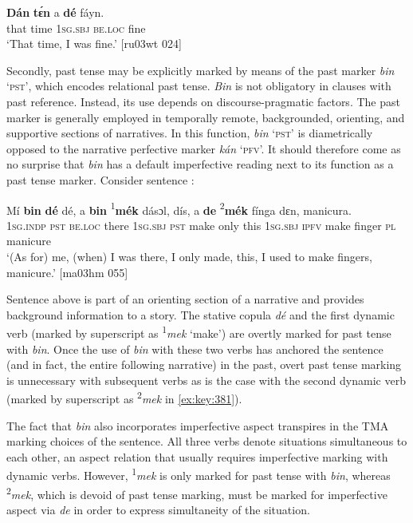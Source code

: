 \ea%
    \label{ex:key:380}
    \gll \textbf{Dán}    \textbf{tɛ́n}    a    \textbf{dé}    fáyn.\\
that    time    \textsc{1sg.sbj}  \textsc{be.loc}  fine\\

\glt ‘That time, I was fine.’ [ru03wt 024]
\z

Secondly, past tense may be explicitly marked by means of the past marker \textit{bin} ‘\textsc{pst’}, which encodes relational past tense. \textit{Bin} is not obligatory in clauses with past reference. Instead, its use depends on discourse-pragmatic factors. The past marker is generally employed in temporally remote, backgrounded, orienting, and supportive sections of narratives. In this function, \textit{bin} ‘\textsc{pst}’ is diametrically opposed to the narrative perfective marker \textit{kán} ‘\textsc{pfv}’. It should therefore come as no surprise that \textit{bin} has a default imperfective reading next to its function as a past tense marker. Consider sentence : 

\ea%
    \label{ex:key:381}
    \gll Mí    \textbf{bin} \textbf{dé}    dé,    a    \textbf{bin} {\textup{\textsuperscript{1}}\textbf{mék}}  dásɔl,  dís,
a    \textbf{de} {\textup{\textsuperscript{2}}\textbf{mék}}  fínga  dɛn,    manicura.\\
\textsc{1sg.indp}  \textsc{pst}  \textsc{be.loc}  there  \textsc{1sg.sbj}  \textsc{pst}  make  only    this
\textsc{1sg.sbj}  \textsc{ipfv}  make  finger  \textsc{pl}    manicure\\

\glt ‘(As for) me, (when) I was there, I only made, this, 
I used to make fingers, manicure.’ [ma03hm 055]
\z

Sentence  above is part of an orienting section of a narrative and provides background information to a story. The stative copula \textit{dé} and the first dynamic verb (marked by superscript as \textsuperscript{1}\textit{mek} ‘make’) are overtly marked for past tense with \textit{bin}. Once the use of \textit{bin} with these two verbs has anchored the sentence (and in fact, the entire following narrative) in the past, overt past tense marking is unnecessary with subsequent verbs as is the case with the second dynamic verb (marked by superscript as \textsuperscript{2}\textit{mek} in \ref{ex:key:381}). 


The fact that \textit{bin} also incorporates imperfective aspect transpires in the TMA marking choices of the sentence. All three verbs denote situations simultaneous to each other, an aspect relation that usually requires imperfective marking with dynamic verbs. However, \textsuperscript{1}\textit{mek} is only marked for past tense with \textit{bin}, whereas \textsuperscript{2}\textit{mek}, which is devoid of past tense marking, must be marked for imperfective aspect via \textit{de} in order to express simultaneity of the situation.



